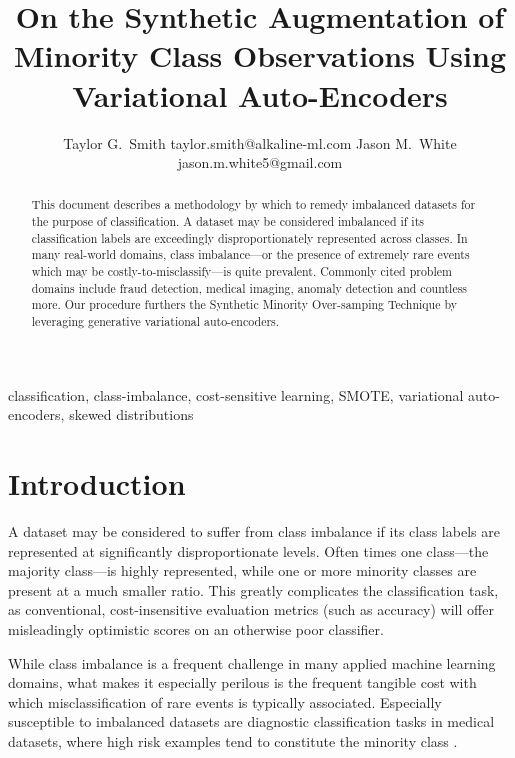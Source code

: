 \documentclass[twoside,11pt]{article}
\begin{document}
\title{On the Synthetic Augmentation of Minority Class Observations Using Variational Auto-Encoders}

\author{\name Taylor G.\ Smith \email taylor.smith@alkaline-ml.com
       \AND
       \name Jason M.\ White \email jason.m.white5@gmail.com}

\maketitle

\begin{abstract}%
This document describes a methodology by which to remedy imbalanced datasets for the purpose of classification. A dataset may be considered imbalanced if its classification labels are exceedingly disproportionately represented across classes. In many real-world domains, class imbalance---or the presence of extremely rare events which may be costly-to-misclassify---is quite prevalent. Commonly cited problem domains include fraud detection, medical imaging, anomaly detection and countless more.  Our procedure furthers the Synthetic Minority Over-samping Technique \citep{chawla2002smote} by leveraging generative variational auto-encoders.
\end{abstract}

\begin{keywords}
  classification, class-imbalance, cost-sensitive learning, SMOTE, variational auto-encoders, skewed distributions
\end{keywords}

\section{Introduction}

A dataset may be considered to suffer from class imbalance if its class labels are represented at significantly disproportionate levels. Often times one class---the majority class---is highly represented, while one or more minority classes are present at a much smaller ratio. This greatly complicates the classification task, as conventional, cost-insensitive evaluation metrics (such as accuracy) will offer misleadingly optimistic scores on an otherwise poor classifier. 

While class imbalance is a frequent challenge in many applied machine learning domains, what makes it especially perilous is the frequent tangible cost with which misclassification of rare events is typically associated. Especially susceptible to imbalanced datasets are diagnostic classification tasks in medical datasets, where high risk examples tend to constitute the minority class \citep{rahman2013addressing}.
\end{document}
